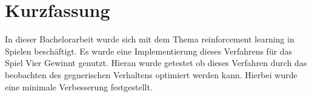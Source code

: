 \chapter{Kurzfassung}

In dieser Bachelorarbeit wurde sich mit dem Thema reinforcement learning in Spielen beschäftigt. Es wurde eine Implementierung dieses Verfahrens für das Spiel Vier Gewinnt genutzt. Hieran wurde getestet ob dieses Verfahren durch das beobachten des gegnerischen Verhaltens optimiert werden kann. Hierbei wurde eine minimale Verbesserung festgestellt.
